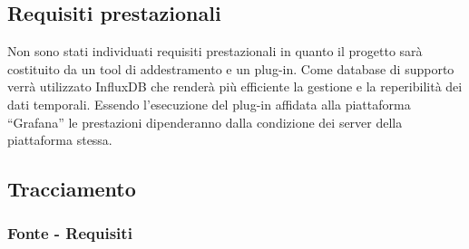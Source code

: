 
	\subsection{Requisiti prestazionali}{
Non sono stati individuati requisiti prestazionali in quanto il progetto sarà costituito da un tool di addestramento e un plug-in. Come database di supporto verrà utilizzato InfluxDB che renderà più efficiente la gestione e la reperibilità dei dati temporali. Essendo l’esecuzione del plug-in affidata alla piattaforma “Grafana”  le prestazioni dipenderanno dalla condizione dei server della piattaforma stessa.}



	\subsection{Tracciamento}
		
		\subsubsection{Fonte - Requisiti}

